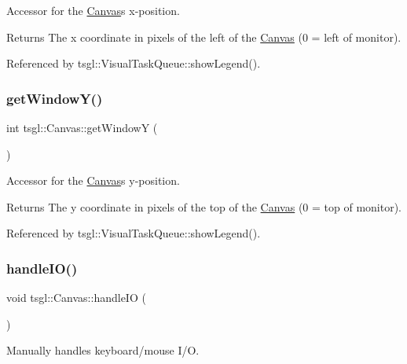 Accessor for the \hyperlink{classtsgl_1_1_canvas}{Canvas}\textquotesingle{}s x-\/position. 

\begin{DoxyReturn}{Returns}
The x coordinate in pixels of the left of the \hyperlink{classtsgl_1_1_canvas}{Canvas} (0 = left of monitor). 
\end{DoxyReturn}


Referenced by tsgl\+::\+Visual\+Task\+Queue\+::show\+Legend().

\mbox{\label{classtsgl_1_1_canvas_ad6e98d17d3e43d79628a3bd05221ee8b}} 
\subsubsection{\texorpdfstring{get\+Window\+Y()}{getWindowY()}}
{\footnotesize\ttfamily int tsgl\+::\+Canvas\+::get\+WindowY (\begin{DoxyParamCaption}{ }\end{DoxyParamCaption})}



Accessor for the \hyperlink{classtsgl_1_1_canvas}{Canvas}\textquotesingle{}s y-\/position. 

\begin{DoxyReturn}{Returns}
The y coordinate in pixels of the top of the \hyperlink{classtsgl_1_1_canvas}{Canvas} (0 = top of monitor). 
\end{DoxyReturn}


Referenced by tsgl\+::\+Visual\+Task\+Queue\+::show\+Legend().

\mbox{\label{classtsgl_1_1_canvas_aa499851e5e4b97bb99ca4fb3d633c17e}} 
\subsubsection{\texorpdfstring{handle\+I\+O()}{handleIO()}}
{\footnotesize\ttfamily void tsgl\+::\+Canvas\+::handle\+IO (\begin{DoxyParamCaption}{ }\end{DoxyParamCaption})}



Manually handles keyboard/mouse I/O. 

